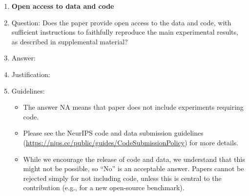 \documentclass{article}
\begin{document}
\begin{enumerate}
\begin{itemize}
        \item While NeurIPS does not require releasing code, the conference does require all submissions to provide some reasonable avenue for reproducibility, which may depend on the nature of the contribution. For example
        \begin{enumerate}
            \item If the contribution is primarily a new algorithm, the paper should make it clear how to reproduce that algorithm.
            \item If the contribution is primarily a new model architecture, the paper should describe the architecture clearly and fully.
            \item If the contribution is a new model (e.g., a large language model), then there should either be a way to access this model for reproducing the results or a way to reproduce the model (e.g., with an open-source dataset or instructions for how to construct the dataset).
            \item We recognize that reproducibility may be tricky in some cases, in which case authors are welcome to describe the particular way they provide for reproducibility. In the case of closed-source models, it may be that access to the model is limited in some way (e.g., to registered users), but it should be possible for other researchers to have some path to reproducing or verifying the results.
        \end{enumerate}
    \end{itemize}
\item {\bf Open access to data and code}
    \item[] Question: Does the paper provide open access to the data and code, with sufficient instructions to faithfully reproduce the main experimental results, as described in supplemental material?
    \item[] Answer: \answerYes{}
    \item[] Justification: \justificationTODO{}
    \item[] Guidelines:
    \begin{itemize}
        \item The answer NA means that paper does not include experiments requiring code.
        \item Please see the NeurIPS code and data submission guidelines (\url{https://nips.cc/public/guides/CodeSubmissionPolicy}) for more details.
        \item While we encourage the release of code and data, we understand that this might not be possible, so “No” is an acceptable answer. Papers cannot be rejected simply for not including code, unless this is central to the contribution (e.g., for a new open-source benchmark).

\end{itemize}
\end{enumerate}
\end{document}
